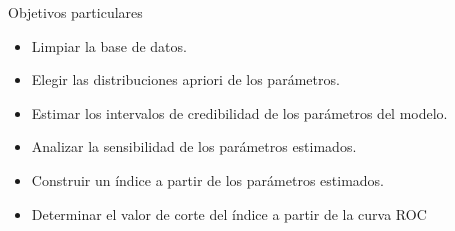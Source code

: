 \documentclass{beamer}
\begin{document}
	\begin{frame}{Objetivos particulares}
    
        \begin{itemize}
            \item Limpiar la base de datos.
            \vspace{0.2cm}
            \item Elegir las distribuciones apriori de los parámetros.
            \vspace{0.2cm}
            \item Estimar los intervalos de credibilidad de los parámetros del modelo.
            \vspace{0.2cm}
            \item Analizar la sensibilidad de los parámetros estimados.
            \vspace{0.2cm}
            \item Construir un índice a partir de los parámetros estimados.
            \vspace{0.2cm}
            \item Determinar el valor de corte del índice a partir de la curva ROC
        \end{itemize}
	\end{frame}






		
\end{document}
